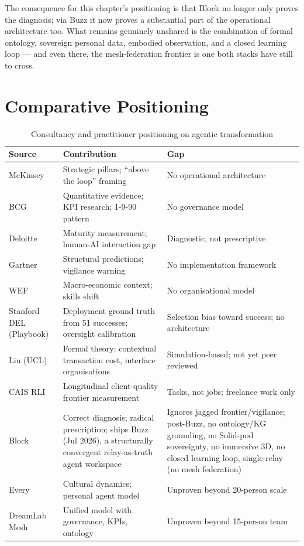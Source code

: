 The consequence for this chapter's positioning is that Block no longer only proves the diagnosis; via Buzz it now proves a substantial part of the operational architecture too. What remains genuinely unshared is the combination of formal ontology, sovereign personal data, embodied observation, and a closed learning loop --- and even there, the mesh-federation frontier is one both stacks have still to cross.

\section{Comparative Positioning}

\begin{table}[h]
\centering
\caption{Consultancy and practitioner positioning on agentic transformation}
\label{tab:landscape-comparison}
\begin{tabularx}{\textwidth}{l X X}
\toprule
\textbf{Source} & \textbf{Contribution} & \textbf{Gap} \\
\midrule
McKinsey & Strategic pillars; ``above the loop'' framing & No operational architecture \\
\addlinespace
BCG & Quantitative evidence; KPI research; 1-9-90 pattern & No governance model \\
\addlinespace
Deloitte & Maturity measurement; human-AI interaction gap & Diagnostic, not prescriptive \\
\addlinespace
Gartner & Structural predictions; vigilance warning & No implementation framework \\
\addlinespace
WEF & Macro-economic context; skills shift & No organisational model \\
\addlinespace
Stanford DEL (Playbook) & Deployment ground truth from 51 successes; oversight calibration & Selection bias toward success; no architecture \\
\addlinespace
Liu (UCL) & Formal theory: contextual transaction cost, interface organisations & Simulation-based; not yet peer reviewed \\
\addlinespace
CAIS RLI & Longitudinal client-quality frontier measurement & Tasks, not jobs; freelance work only \\
\addlinespace
Block & Correct diagnosis; radical prescription; ships Buzz (Jul 2026), a structurally convergent relay-as-truth agent workspace & Ignores jagged frontier/vigilance; post-Buzz, no ontology/KG grounding, no Solid-pod sovereignty, no immersive 3D, no closed learning loop, single-relay (no mesh federation) \\
\addlinespace
Every & Cultural dynamics; personal agent model & Unproven beyond 20-person scale \\
\addlinespace
DreamLab Mesh & Unified model with governance, KPIs, ontology & Unproven beyond 15-person team \\
\bottomrule
\end{tabularx}
\end{table}

